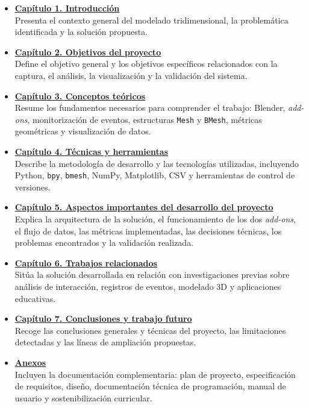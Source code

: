 \begin{itemize}

\item \hyperref[cap:introduccion]{\textbf{Capítulo 1. Introducción}}\\
Presenta el contexto general del modelado tridimensional, la problemática identificada y la solución propuesta.

\item \hyperref[cap:objetivos]{\textbf{Capítulo 2. Objetivos del proyecto}}\\
Define el objetivo general y los objetivos específicos relacionados con la captura, el análisis, la visualización y la validación del sistema.

\item \hyperref[cap:conceptos]{\textbf{Capítulo 3. Conceptos teóricos}}\\
Resume los fundamentos necesarios para comprender el trabajo: Blender, \textit{add-ons}, monitorización de eventos, estructuras \texttt{Mesh} y \texttt{BMesh}, métricas geométricas y visualización de datos.

\item \hyperref[cap:tecnicas]{\textbf{Capítulo 4. Técnicas y herramientas}}\\
Describe la metodología de desarrollo y las tecnologías utilizadas, incluyendo Python, \texttt{bpy}, \texttt{bmesh}, NumPy, Matplotlib, CSV y herramientas de control de versiones.

\item \hyperref[cap:desarrollo]{\textbf{Capítulo 5. Aspectos importantes del desarrollo del proyecto}}\\
Explica la arquitectura de la solución, el funcionamiento de los dos \textit{add-ons}, el flujo de datos, las métricas implementadas, las decisiones técnicas, los problemas encontrados y la validación realizada.

\item \hyperref[cap:trabajos-relacionados]{\textbf{Capítulo 6. Trabajos relacionados}}\\
Sitúa la solución desarrollada en relación con investigaciones previas sobre análisis de interacción, registros de eventos, modelado 3D y aplicaciones educativas.

\item \hyperref[cap:conclusiones]{\textbf{Capítulo 7. Conclusiones y trabajo futuro}}\\
Recoge las conclusiones generales y técnicas del proyecto, las limitaciones detectadas y las líneas de ampliación propuestas.

\item \hyperref[cap:anexos]{\textbf{Anexos}}\\
Incluyen la documentación complementaria: plan de proyecto, especificación de requisitos, diseño, documentación técnica de programación, manual de usuario y sostenibilización curricular.

\end{itemize}
